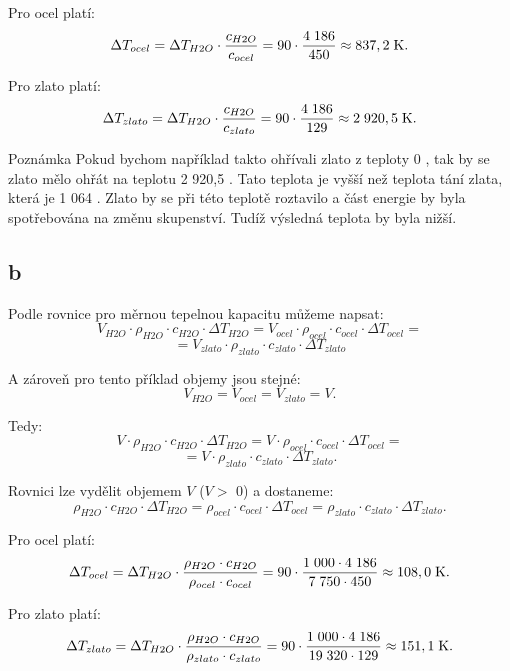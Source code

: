 \documentclass{article}
\begin{document}
Pro ocel platí:
$$
    \Delta T_{ocel} = \Delta T_{H2O} \cdot \frac{c_{H2O}}{c_{ocel}} = 90 \cdot \frac{4 \; 186}{450} \approx 837,2 \; \textrm{K}.
$$

Pro zlato platí:
$$
    \Delta T_{zlato} = \Delta T_{H2O} \cdot \frac{c_{H2O}}{c_{zlato}} = 90 \cdot \frac{4 \; 186}{129} \approx 2 \; 920,5 \; \textrm{K}.
$$

\begin{notebox}{Poznámka}
    Pokud bychom například takto ohřívali zlato z teploty 0 \ueqCELS, tak by se zlato mělo ohřát na teplotu 2 920,5 \ueqCELS. Tato teplota je vyšší než teplota tání zlata, která je 1 064 \ueqCELS. Zlato by se při této teplotě roztavilo a část energie by byla spotřebována na změnu skupenství. Tudíž výsledná teplota by byla nižší.
\end{notebox}



\subsection{b}

Podle rovnice pro měrnou tepelnou kapacitu můžeme napsat:
$$
    V_{H2O} \cdot \rho_{H2O} \cdot c_{H2O} \cdot \Delta T_{H2O} = V_{ocel} \cdot \rho_{ocel} \cdot c_{ocel} \cdot \Delta T_{ocel} =
$$
$$
    = V_{zlato} \cdot \rho_{zlato} \cdot c_{zlato} \cdot \Delta T_{zlato}
$$

A zároveň pro tento příklad objemy jsou stejné:
$$
    V_{H2O} = V_{ocel} = V_{zlato} = V.
$$

Tedy:
$$
    V \cdot \rho_{H2O} \cdot c_{H2O} \cdot \Delta T_{H2O} = V \cdot \rho_{ocel} \cdot c_{ocel} \cdot \Delta T_{ocel} =
$$
$$
    =  V \cdot \rho_{zlato} \cdot c_{zlato} \cdot \Delta T_{zlato}.
$$

Rovnici lze vydělit objemem $V$ ($V >$ 0) a dostaneme:
$$
    \rho_{H2O} \cdot c_{H2O} \cdot \Delta T_{H2O} = \rho_{ocel} \cdot c_{ocel} \cdot \Delta T_{ocel} = \rho_{zlato} \cdot c_{zlato} \cdot \Delta T_{zlato}.
$$

Pro ocel platí:
$$
    \Delta T_{ocel} = \Delta T_{H2O} \cdot \frac{\rho_{H2O} \cdot c_{H2O}}{\rho_{ocel} \cdot c_{ocel}} = 90 \cdot \frac{1 \; 000 \cdot 4 \; 186}{7 \; 750 \cdot 450} \approx 108,0 \; \textrm{K}.
$$

Pro zlato platí:
$$
    \Delta T_{zlato} = \Delta T_{H2O} \cdot \frac{\rho_{H2O} \cdot c_{H2O}}{\rho_{zlato} \cdot c_{zlato}} = 90 \cdot \frac{1 \; 000 \cdot 4 \; 186}{19 \; 320 \cdot 129} \approx 151,1 \; \textrm{K}.
$$
\end{document}
